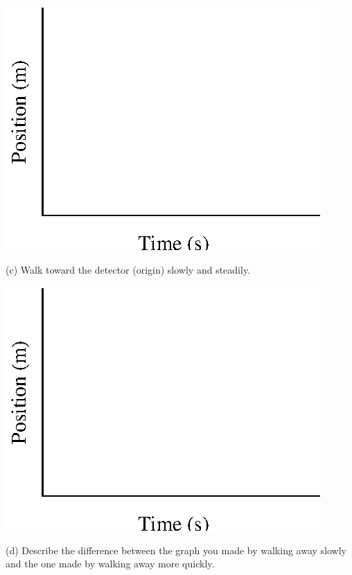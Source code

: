 \vspace{0.3cm}
{\par\centering \includegraphics{position/position_fig1.eps} \par}
\vspace{0.3cm}

(c) Walk toward the detector (origin) slowly and steadily.

\vspace{0.3cm}
{\par\centering \includegraphics{position/position_fig1.eps} \par}
\vspace{0.3cm}

(d) Describe the difference between the graph you made by walking away slowly
and the one made by walking away more quickly.
\answerspace{20mm}

